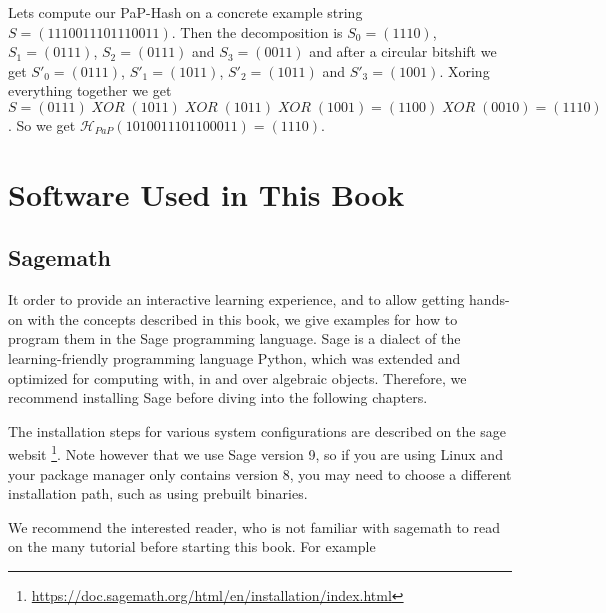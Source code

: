 \begin{example}
Lets compute our PaP-Hash on a concrete example string $S=(1110011101110011)$. Then the decomposition is $S_0=(1110)$, $S_1=(0111)$, $S_2=(0111)$ and $S_3=(0011)$ and after a circular bitshift we get $S'_0=(0111)$, $S'_1=(1011)$, $S'_2=(1011)$ and $S'_3=(1001)$. Xoring everything together we get $S= (0111) \; XOR \; (1011)\; XOR \; (1011)\; XOR \; (1001) = (1100) \; XOR\;
(0010) = (1110)$. So we get $\mathcal{H}_{PaP}(1010 0111 0110 0011) = (1110)$.
\end{example}


\section{Software Used in This Book}

\subsection{Sagemath}
\label{sagemath_setup}
It order to provide an interactive learning experience, and to allow getting hands-on with the concepts described in this book, we give examples for how to program them in the Sage programming language. Sage is a dialect of the learning-friendly programming language Python, which was extended and optimized for computing with, in and over algebraic objects. Therefore, we recommend installing Sage before diving into the following chapters.

The installation steps for various system configurations are described on the sage websit \footnote{\url{https://doc.sagemath.org/html/en/installation/index.html}}. Note however that we use Sage version 9, so if you are using Linux and your package manager only contains version 8, you may need to choose a different installation path, such as using prebuilt binaries.

We recommend the interested reader, who is not familiar with sagemath to read on the many tutorial before starting this book. For example 



